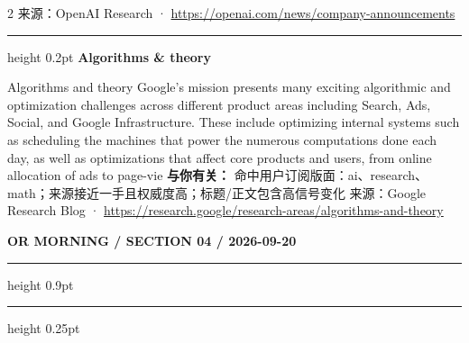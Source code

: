\documentclass[10.5pt]{ctexart}
\begin{document}
\begin{multicols}{2}
{\footnotesize\color{ormuted} 来源：OpenAI Research · \url{https://openai.com/news/company-announcements}}
\vspace{2mm}
\hrule height 0.2pt
\vspace{2mm}
{\large\bfseries Algorithms \& theory}\par
Algorithms and theory Google’s mission presents many exciting algorithmic and optimization challenges across different product areas including Search, Ads, Social, and Google Infrastructure. These include optimizing internal systems such as scheduling the machines that power the numerous computations done each day, as well as optimizations that affect core products and users, from online allocation of ads to page-vie
\textbf{与你有关：} 命中用户订阅版面：ai、research、math；来源接近一手且权威度高；标题/正文包含高信号变化
{\footnotesize\color{ormuted} 来源：Google Research Blog · \url{https://research.google/research-areas/algorithms-and-theory}}
\end{multicols}
\newpage
{\small\bfseries OR MORNING / SECTION 04 / 2026-09-20}
\vspace{2mm}
\hrule height 0.9pt
\vspace{1.5mm}
\hrule height 0.25pt
\vspace{4mm}
\end{document}
